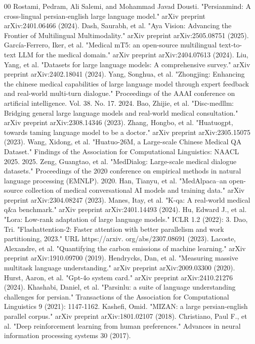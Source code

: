 \documentclass[conference]{IEEEtran}
\begin{document}
\begin{thebibliography}{00}
		Rostami, Pedram, Ali Salemi, and Mohammad Javad Dousti. "Persianmind: A cross-lingual persian-english large language model." arXiv preprint arXiv:2401.06466 (2024).
		Dash, Saurabh, et al. "Aya Vision: Advancing the Frontier of Multilingual Multimodality." arXiv preprint arXiv:2505.08751 (2025).
		García-Ferrero, Iker, et al. "Medical mT5: an open-source multilingual text-to-text LLM for the medical domain." arXiv preprint arXiv:2404.07613 (2024).
		Liu, Yang, et al. "Datasets for large language models: A comprehensive survey." arXiv preprint arXiv:2402.18041 (2024).
		Yang, Songhua, et al. "Zhongjing: Enhancing the chinese medical capabilities of large language model through expert feedback and real-world multi-turn dialogue." Proceedings of the AAAI conference on artificial intelligence. Vol. 38. No. 17. 2024.
		Bao, Zhijie, et al. "Disc-medllm: Bridging general large language models and real-world medical consultation." arXiv preprint arXiv:2308.14346 (2023).
		Zhang, Hongbo, et al. "Huatuogpt, towards taming language model to be a doctor." arXiv preprint arXiv:2305.15075 (2023).
		Wang, Xidong, et al. "Huatuo-26M, a Large-scale Chinese Medical QA Dataset." Findings of the Association for Computational Linguistics: NAACL 2025. 2025.
		Zeng, Guangtao, et al. "MedDialog: Large-scale medical dialogue datasets." Proceedings of the 2020 conference on empirical methods in natural language processing (EMNLP). 2020.
		Han, Tianyu, et al. "MedAlpaca--an open-source collection of medical conversational AI models and training data." arXiv preprint arXiv:2304.08247 (2023).
		Manes, Itay, et al. "K-qa: A real-world medical q\&a benchmark." arXiv preprint arXiv:2401.14493 (2024).
		Hu, Edward J., et al. "Lora: Low-rank adaptation of large language models." ICLR 1.2 (2022): 3.
		Dao, Tri. "Flashattention-2: Faster attention with better parallelism and work partitioning, 2023." URL https://arxiv. org/abs/2307.08691 (2023).
		Lacoste, Alexandre, et al. "Quantifying the carbon emissions of machine learning." arXiv preprint arXiv:1910.09700 (2019).
		Hendrycks, Dan, et al. "Measuring massive multitask language understanding." arXiv preprint arXiv:2009.03300 (2020).
		Hurst, Aaron, et al. "Gpt-4o system card." arXiv preprint arXiv:2410.21276 (2024).
		Khashabi, Daniel, et al. "Parsinlu: a suite of language understanding challenges for persian." Transactions of the Association for Computational Linguistics 9 (2021): 1147-1162.
		Kashefi, Omid. "MIZAN: a large persian-english parallel corpus." arXiv preprint arXiv:1801.02107 (2018).
             Christiano, Paul F., et al. "Deep reinforcement learning from human preferences." Advances in neural information processing systems 30 (2017).
	\end{thebibliography}
	
	
\end{document}
